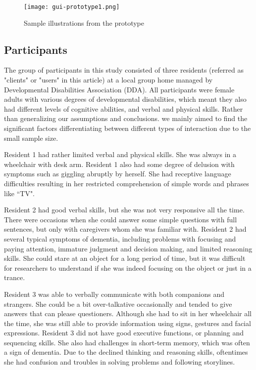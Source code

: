 \documentclass[letterpaper, 10 pt, conference]{ieeeconf}  %
\begin{document}
\begin{figure}[hbt]
\centering
\texttt{[image: gui-prototype1.png]}
 \caption{Sample illustrations from the prototype}
\label{fig:prototype1}
\end{figure}

\subsection{Participants}

The group of participants in this study consisted of three residents (referred as "clients" or "users" in this article)  at a local group home managed by Developmental Disabilities Association (DDA). All participants were female adults with various degrees of developmental disabilities, which meant they also had different levels of cognitive abilities, and verbal and physical skills. Rather than generalizing our assumptions and conclusions. we mainly aimed to find the significant factors differentiating between different types of interaction due to the small sample size.

Resident 1 had rather limited verbal and physical skills. She was always in a wheelchair with desk arm. Resident 1 also had some degree of delusion with symptoms such as giggling abruptly by herself. She had receptive language difficulties resulting in her restricted comprehension of simple words and phrases like ``TV".

Resident 2 had good verbal skills, but she was not very responsive all the time. There were occasions when she could answer some simple questions with full sentences, but only with caregivers whom she was familiar with. Resident 2 had several typical symptoms of dementia, including problems with focusing and paying attention, immature judgment and decision making, and limited reasoning skills. She could stare at an object for a long period of time, but it was difficult for researchers to understand if she was indeed focusing on the object or just in a trance.

Resident 3 was able to verbally communicate with both companions and strangers. She could be a bit over-talkative occasionally and tended to give answers that can please questioners. Although she had to sit in her wheelchair all the time, she was still able to provide information using signs, gestures and facial expressions. Resident 3 did not have good executive functions, or planning and sequencing skills. She also had challenges in short-term memory, which was often a sign of dementia. Due to the declined thinking and reasoning skills, oftentimes she had confusion and troubles in solving problems and following storylines.
\end{document}
